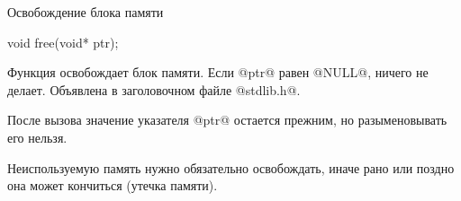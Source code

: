 \begin{frame}[fragile]{Освобождение блока памяти}

  \begin{clisting}[basicstyle=\ttfamily]
    void free(void* ptr);
  \end{clisting}

  Функция освобождает блок памяти. Если @ptr@ равен @NULL@, ничего не делает.
  Объявлена в заголовочном файле @stdlib.h@.

  \pause
  После вызова значение указателя @ptr@ остается прежним, но разыменовывать его
  нельзя.

  \pause
  Неиспользуемую память нужно обязательно освобождать, иначе рано или поздно
  она может кончиться (утечка памяти).



\end{frame}

